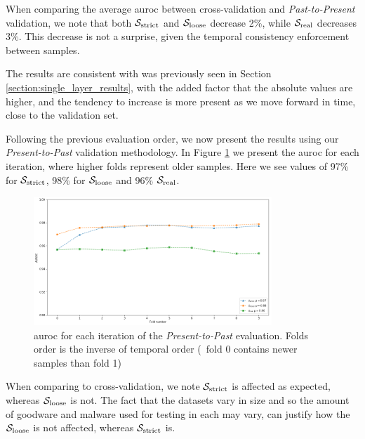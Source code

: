 When comparing the average \gls{auroc} between cross-validation and \textit{Past-to-Present} validation, we note that both $\mathcal{S}_{\mathrm{strict}}$ and $\mathcal{S}_{\mathrm{loose}}$ decrease 2\%, while $\mathcal{S}_{\mathrm{real}}$ decreases 3\%.
This decrease is not a surprise, given the temporal consistency enforcement between samples.

The results are consistent with was previously seen in Section \ref{section:single_layer_results}, with the added factor that the absolute values are higher, and the tendency to increase is more present as we move forward in time, close to the validation set.

\medskip

Following the previous evaluation order, we now present the results using our \textit{Present-to-Past} validation methodology.
In Figure \ref{fig:presentpast_improved} we present the \gls{auroc} for each iteration, where higher folds represent older samples. Here we see values of 97\% for $\mathcal{S}_{\mathrm{strict}}$, 98\% for $\mathcal{S}_{\mathrm{loose}}$ and 96\% $\mathcal{S}_{\mathrm{real}}$.

\begin{figure}[!h]
	\centering
	\includegraphics[width=0.8\textwidth]{Figures/presentpast_improved.png}
	\caption[Multi layer results for dynamic features in \textit{Present-to-Past}.]{\gls{auroc} for each iteration of the \textit{Present-to-Past} evaluation. Folds order is the inverse of temporal order (\ie\ fold 0 contains newer samples than fold 1)}
	\label{fig:presentpast_improved}
\end{figure}

When comparing to cross-validation, we note $\mathcal{S}_{\mathrm{strict}}$ is affected as expected, whereas $\mathcal{S}_{\mathrm{loose}}$ is not.
The fact that the datasets vary in size and so the amount of goodware and malware used for testing in each may vary, can justify how the $\mathcal{S}_{\mathrm{loose}}$ is not affected, whereas $\mathcal{S}_{\mathrm{strict}}$ is.

